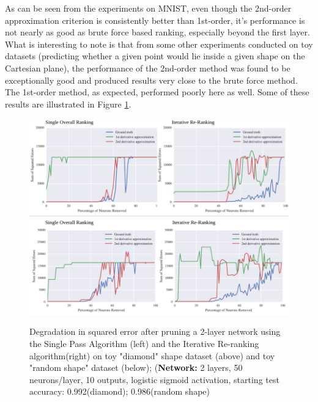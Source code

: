 As can be seen from the experiments on MNIST, even though the 2nd-order approximation criterion is consistently better than 1st-order, it's performance is not nearly as good as brute force based ranking, especially beyond the first layer. What is interesting to note is that from some other experiments conducted on toy datasets (predicting whether a given point would lie inside a given shape on the Cartesian plane), the performance of the 2nd-order method was found to be exceptionally good and produced results very close to the brute force method. The 1st-order method, as expected, performed poorly here as well. Some of these results are illustrated in Figure \ref{fig:diamond}. 

\begin{figure}[!hb]
\centering
\includegraphics[width=0.80\linewidth]{png/diamond.png}
\includegraphics[width=0.80\linewidth]{png/rshape.png}
\caption{Degradation in squared error after pruning a 2-layer network using the Single Pass Algorithm (left) and the Iterative Re-ranking algorithm(right) on toy "diamond" shape dataset (above) and toy "random shape" dataset (below); (\textbf{Network:} 2 layers, 50 neurons/layer, 10 outputs, logistic sigmoid activation, starting test accuracy: 0.992(diamond); 0.986(random shape)}
\label{fig:diamond}
\end{figure}

